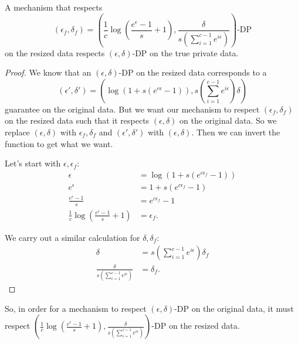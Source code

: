 \documentclass[11pt]{scrartcl} %
\begin{document}
\begin{theorem}
    A mechanism that respects 
    \[ (\epsilon_f, \delta_f) = \left( \frac{1}{c}\log\left(\frac{e^{\epsilon}-1}{s} + 1 \right), \frac{\delta}{s\left(\sum_{i=1}^{c-1}e^{i \epsilon}\right)} \right)\text{-DP} \] 
    on the resized data respects $(\epsilon, \delta)$-DP on the true private data.
    \begin{proof}
        We know that an $(\epsilon, \delta)$-DP on the resized data corresponds to a 
        \[ (\epsilon', \delta') = \left(\log\left(1+s\left(e^{c\epsilon}-1\right) \right), s\left(\sum_{i=1}^{c-1}e^{i \epsilon}\right)\delta \right) \]
        guarantee on the original data. But we want our mechanism to respect $(\epsilon_f, \delta_f)$ on the resized data such that it 
        respects $(\epsilon, \delta)$ on the original data. So we replace $(\epsilon, \delta)$ with 
        $\epsilon_f, \delta_f$ and $(\epsilon', \delta')$ with $(\epsilon, \delta)$. 
        Then we can invert the function to get what we want. \newline 

        Let's start with $\epsilon, \epsilon_f$:
        \begin{align*}
            \epsilon &= \log\left(1+s\left(e^{c\epsilon_f}-1\right)\right) \\
            e^{\epsilon} &= 1+s\left(e^{c\epsilon_f}-1\right) \\
            \frac{e^{\epsilon}-1}{s} &= e^{c\epsilon_f}-1 \\
            \frac{1}{c}\log\left(\frac{e^{\epsilon}-1}{s} + 1 \right) &= \epsilon_f.
        \end{align*}

        We carry out a similar calculation for $\delta, \delta_f$:
        \begin{align*}
            \delta &= s\left(\sum_{i=1}^{c-1}e^{i \epsilon}\right)\delta_f \\
            \frac{\delta}{s\left(\sum_{i=1}^{c-1}e^{i \epsilon}\right)} &= \delta_f.
        \end{align*}
    \end{proof} 
    So, in order for a mechanism to respect $(\epsilon, \delta)$-DP on the original data, it must respect 
    $\left( \frac{1}{c}\log\left(\frac{e^{\epsilon}-1}{s} + 1 \right), \frac{\delta}{s\left(\sum_{i=1}^{c-1}e^{i \epsilon}\right)} \right)$-DP 
    on the resized data.
\end{theorem}
\end{document}
